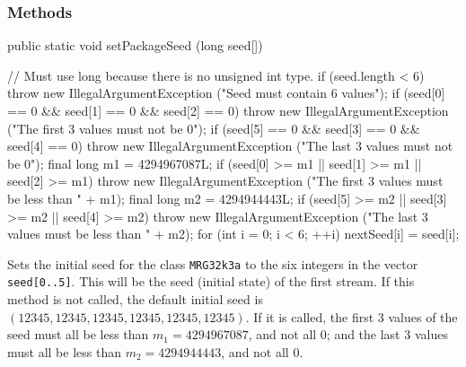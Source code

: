 \subsubsection* {Methods}
\begin{code}

   public static void setPackageSeed (long seed[]) \begin{hide} {
      // Must use long because there is no unsigned int type.
      if (seed.length < 6)
         throw new IllegalArgumentException ("Seed must contain 6 values");
      if (seed[0] == 0 && seed[1] == 0 && seed[2] == 0)
         throw new IllegalArgumentException
             ("The first 3 values must not be 0");
      if (seed[5] == 0 && seed[3] == 0 && seed[4] == 0)
         throw new IllegalArgumentException
             ("The last 3 values must not be 0");
      final long m1 = 4294967087L;
      if (seed[0] >= m1 || seed[1] >= m1 || seed[2] >= m1)
         throw new IllegalArgumentException
             ("The first 3 values must be less than " + m1);
      final long m2 = 4294944443L;
      if (seed[5] >= m2 || seed[3] >= m2 || seed[4] >= m2)
         throw new IllegalArgumentException
             ("The last 3 values must be less than " + m2);
      for (int i = 0; i < 6;  ++i)
         nextSeed[i] = seed[i];
   }\end{hide}
\end{code}
  \begin{tabb}  Sets the initial seed for the class \texttt{MRG32k3a} to the
   six integers in the vector \texttt{seed[0..5]}.
   This will be the seed (initial state) of the first stream.
   If this method is not called, the default initial seed
   is $(12345, 12345, 12345, 12345, 12345, 12345)$.
   If it is called, the first 3 values of the seed must all be
   less than $m_1 = 4294967087$, and not all 0;
   and the last 3 values
   must all be less than $m_2 = 4294944443$, and not all 0.
 \end{tabb}
\begin{htmlonly}
\end{htmlonly}
